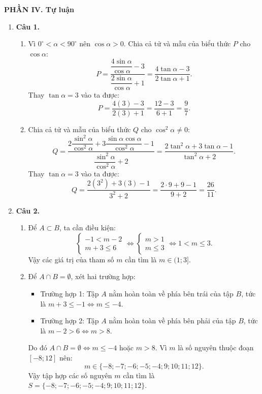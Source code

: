 \documentclass[12pt,a4paper]{article}
\begin{document}
\newpage
\textbf{\large PHẦN IV. Tự luận}
\begin{enumerate}[leftmargin=0.6cm, itemsep=6pt]
    \item \textbf{Câu 1.}
    \begin{enumerate}
        \item Vì $0^\circ < \alpha < 90^\circ$ nên $\cos \alpha > 0$. Chia cả tử và mẫu của biểu thức $P$ cho $\cos \alpha$:
        \[P = \dfrac{\dfrac{4\sin \alpha}{\cos \alpha} - 3}{\dfrac{2\sin \alpha}{\cos \alpha} + 1} = \dfrac{4\tan \alpha - 3}{2\tan \alpha + 1}.\]
        Thay $\tan \alpha = 3$ vào ta được:
        \[P = \dfrac{4(3) - 3}{2(3) + 1} = \dfrac{12 - 3}{6 + 1} = \dfrac{9}{7}.\]
        
        \item Chia cả tử và mẫu của biểu thức $Q$ cho $\cos^2 \alpha \ne 0$:
        \[Q = \dfrac{2\dfrac{\sin^2 \alpha}{\cos^2 \alpha} + 3\dfrac{\sin \alpha \cos \alpha}{\cos^2 \alpha} - 1}{\dfrac{\sin^2 \alpha}{\cos^2 \alpha} + 2} = \dfrac{2\tan^2 \alpha + 3\tan \alpha - 1}{\tan^2 \alpha + 2}.\]
        Thay $\tan \alpha = 3$ vào ta được:
        \[Q = \dfrac{2(3^2) + 3(3) - 1}{3^2 + 2} = \dfrac{2 \cdot 9 + 9 - 1}{9 + 2} = \dfrac{26}{11}.\]
    \end{enumerate}

    \item \textbf{Câu 2.}
    \begin{enumerate}
        \item Để $A \subset B$, ta cần điều kiện:
        \[\begin{cases} -1 < m - 2 \\ m + 3 \le 6 \end{cases} \iff \begin{cases} m > 1 \\ m \le 3 \end{cases} \iff 1 < m \le 3.\]
        Vậy các giá trị của tham số $m$ cần tìm là $m \in (1; 3]$.
        
        \item Để $A \cap B = \emptyset$, xét hai trường hợp:
        \begin{itemize}
            \item Trường hợp 1: Tập $A$ nằm hoàn toàn về phía bên trái của tập $B$, tức là $m + 3 \le -1 \iff m \le -4$.
            \item Trường hợp 2: Tập $A$ nằm hoàn toàn về phía bên phải của tập $B$, tức là $m - 2 > 6 \iff m > 8$.
        \end{itemize}
        Do đó $A \cap B = \emptyset \iff m \le -4$ hoặc $m > 8$.
        Vì $m$ là số nguyên thuộc đoạn $[-8; 12]$ nên:
        \[m \in \{-8; -7; -6; -5; -4; 9; 10; 11; 12\}.\]
        Vậy tập hợp các số nguyên $m$ cần tìm là $S = \{-8; -7; -6; -5; -4; 9; 10; 11; 12\}$.
    \end{enumerate}


\end{enumerate}
\end{document}
